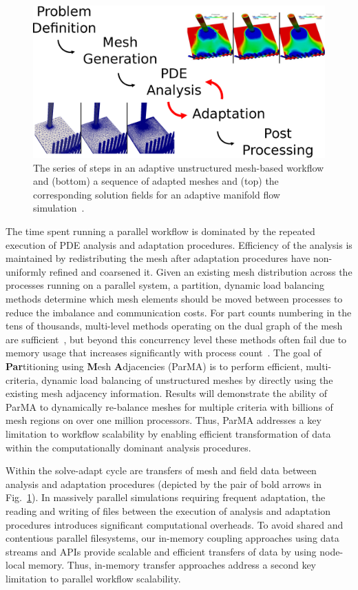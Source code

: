 \begin{figure} \centering
  \includegraphics[width=.8\textwidth]{presentation/figs/SimulationBasedEngineeringWorkflow2.eps}
  \caption{
    The series of steps in an adaptive unstructured mesh-based workflow and
    (bottom) a sequence of adapted meshes and (top) the corresponding solution
    fields for an adaptive manifold flow
    simulation~\cite{ovcharenko2013parallel}.
  }
  \label{fig:workflow}
\end{figure}

The time spent running a parallel workflow is dominated by the repeated
execution of PDE analysis and adaptation procedures.
Efficiency of the analysis is maintained by redistributing the mesh after
adaptation procedures have non-uniformly refined and coarsened it.
Given an existing mesh distribution across the processes running on a parallel system,
a partition, dynamic load balancing methods determine which mesh elements should
be moved between processes to reduce the imbalance and communication costs.
For part counts numbering in the tens of thousands, multi-level methods
operating on the dual graph of the mesh are sufficient~\cite{karypis1999parallel}, 
but beyond this concurrency level these methods often fail due to memory usage
that increases significantly with process count~\cite{harlacherMortonSFCvsParmetis2012}.
The goal of \textbf{Par}titioning using \textbf{M}esh \textbf{A}djacencies (ParMA)
is to perform efficient, multi-criteria, dynamic load balancing of
unstructured meshes by directly using the existing mesh adjacency information.
Results will demonstrate the ability of ParMA to dynamically re-balance meshes
for multiple criteria with billions of mesh regions on over one million
processors.
Thus, ParMA addresses a key limitation to workflow scalability by enabling
efficient transformation of data within the computationally dominant analysis
procedures.

Within the solve-adapt cycle are transfers of mesh and field data between
analysis and adaptation procedures (depicted by the pair of bold arrows in
Fig.~\ref{fig:workflow}).
In massively parallel simulations requiring frequent adaptation, the reading and
writing of files between the execution of analysis and adaptation procedures
introduces significant computational overheads.
To avoid shared and contentious parallel filesystems, our in-memory coupling
approaches using data streams and APIs provide scalable and efficient transfers
of data by using node-local memory.
Thus, in-memory transfer approaches address a second key limitation to parallel
workflow scalability.

